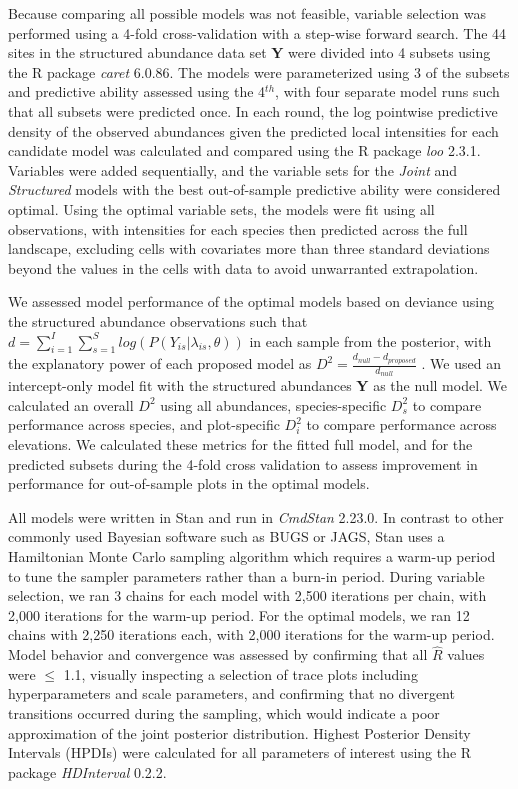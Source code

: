 \documentclass[preprint,review,times,12pt,3p]{elsarticle}
\begin{document}
Because comparing all possible models was not feasible, variable selection was performed using a 4-fold cross-validation with a step-wise forward search. The 44 sites in the structured abundance data set \textbf{Y} were divided into 4 subsets using the R package \emph{caret} 6.0.86. The models were parameterized using 3 of the subsets and predictive ability assessed using the 4$^{th}$, with four separate model runs such that all subsets were predicted once. In each round, the log pointwise predictive density of the observed abundances given the predicted local intensities for each candidate model was calculated and compared using the R package \emph{loo} 2.3.1. Variables were added sequentially, and the variable sets for the \emph{Joint} and \emph{Structured} models with the best out-of-sample predictive ability were considered optimal. Using the optimal variable sets, the models were fit using all observations, with intensities for each species then predicted across the full landscape, excluding cells with covariates more than three standard deviations beyond the values in the cells with data to avoid unwarranted extrapolation.

We assessed model performance of the optimal models based on deviance using the structured abundance observations such that $d = \sum_{i=1}^{I}\sum_{s=1}^S log(P(Y_{is} | \lambda_{is}, \theta))$ in each sample from the posterior, with the explanatory power of each proposed model as $D^2 = \frac{d_{null} - d_{proposed}}{d_{null}}$ \citep{Caradima2019,Guisan2000}. We used an intercept-only model fit with the structured abundances \textbf{Y} as the null model. We calculated an overall $D^2$ using all abundances, species-specific $D^2_s$ to compare performance across species, and plot-specific $D^2_i$ to compare performance across elevations. We calculated these metrics for the fitted full model, and for the predicted subsets during the 4-fold cross validation to assess improvement in performance for out-of-sample plots in the optimal models.

All models were written in Stan \citep{Carpenter2017} and run in \emph{CmdStan} 2.23.0. In contrast to other commonly used Bayesian software such as BUGS or JAGS, Stan uses a Hamiltonian Monte Carlo sampling algorithm which requires a warm-up period to tune the sampler parameters rather than a burn-in period. During variable selection, we ran 3 chains for each model with 2,500 iterations per chain, with 2,000 iterations for the warm-up period. For the optimal models, we ran 12 chains with 2,250 iterations each, with 2,000 iterations for the warm-up period. Model behavior and convergence was assessed by confirming that all $\hat{R}$ values were $\leq$ 1.1, visually inspecting a selection of trace plots including hyperparameters and scale parameters, and confirming that no divergent transitions occurred during the sampling, which would indicate a poor approximation of the joint posterior distribution. Highest Posterior Density Intervals (HPDIs) were calculated for all parameters of interest using the R package \emph{HDInterval} 0.2.2.
\end{document}
